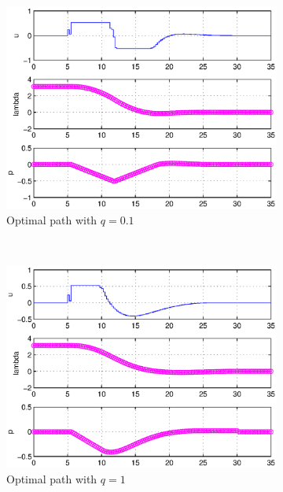 \begin{figure}[H]
        \centering
        \begin{subfigure}[b]{0.5\textwidth}
                \includegraphics[width=\textwidth]{day2q0komma1}
                \caption{Optimal path with $q = 0.1$}
                \label{fig:estimatedDay201}
        \end{subfigure}%
        ~ 
        \begin{subfigure}[b]{0.5\textwidth}
                \includegraphics[width=\textwidth]{day2q1}
                \caption{Optimal path with $q = 1$}
                \label{fig:estimatedDay202}
        \end{subfigure}
        ~ 
        \begin{subfigure}[b]{0.5\textwidth}

\end{subfigure}
\end{figure}
